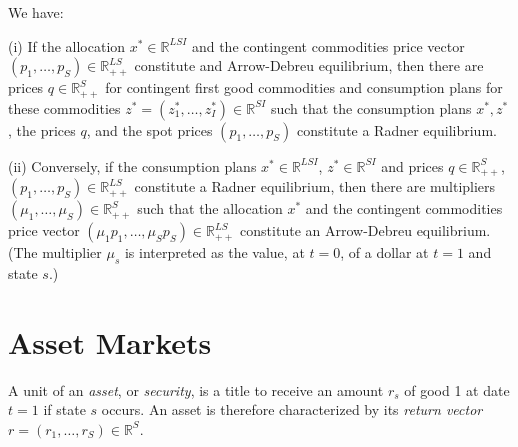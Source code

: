 \begin{prop}
    We have:

    (i) If the allocation $x^* \in \mathbb{R}^{LSI}$ and the contingent commodities price vector $(p_1, \dots, p_S) \in \mathbb{R}^{LS}_{++}$ constitute and Arrow-Debreu equilibrium, then there are prices $q \in \mathbb{R}^{S}_{++}$ for contingent first good commodities and consumption plans for these commodities $z^* = (z^*_{1}, \dots, z^*_{I}) \in \mathbb{R}^{SI}$ such that the consumption plans $x^*, z^*$, the prices $q$, and the spot prices $(p_1, \dots, p_S)$ constitute a Radner equilibrium.

    (ii) Conversely, if the consumption plans $x^* \in \mathbb{R}^{LSI}$, $z^* \in \mathbb{R}^{SI}$ and prices $q \in \mathbb{R}^{S}_{++}$, $(p_1, \dots, p_S) \in \mathbb{R}^{LS}_{++}$ constitute a Radner equilibrium, then there are multipliers $(\mu_1, \dots, \mu_S) \in \mathbb{R}^{S}_{++}$ such that the allocation $x^*$ and the contingent commodities price vector $(\mu_1 p_1, \dots, \mu_S p_S) \in \mathbb{R}^{LS}_{++}$ constitute an Arrow-Debreu equilibrium. (The multiplier $\mu_s$ is interpreted as the value, at $t = 0$, of a dollar at $t = 1$ and state $s$.)
\end{prop}


\section{Asset Markets}

\begin{defn}
    A unit of an \emph{asset}, or \emph{security}, is a title to receive an amount $r_s$ of good 1 at date $t = 1$ if state $s$ occurs. An asset is therefore characterized by its \emph{return vector} $r = (r_1, \dots, r_S) \in \mathbb{R}^{S}$.
\end{defn}

